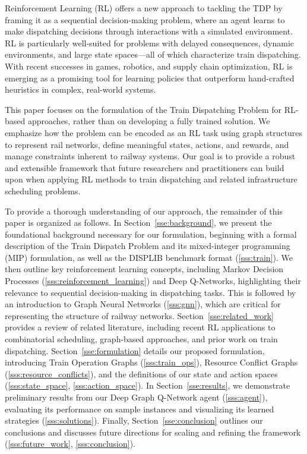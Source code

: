 \documentclass[runningheads]{llncs}
\begin{document}
Reinforcement Learning (RL) offers a new approach to tackling the TDP by framing it as a sequential decision-making problem, where an agent learns to make dispatching decisions through interactions with a simulated environment. 
RL is particularly well-suited for problems with delayed consequences, dynamic environments, and large state spaces—all of which characterize train dispatching. 
With recent successes in games, robotics, and supply chain optimization, RL is emerging as a promising tool for learning policies that outperform hand-crafted heuristics in complex, real-world systems.

This paper focuses on the formulation of the Train Dispatching Problem for RL-based approaches, rather than on developing a fully trained solution. 
We emphasize how the problem can be encoded as an RL task using graph structures to represent rail networks, define meaningful states, actions, and rewards, and manage constraints inherent to railway systems. 
Our goal is to provide a robust and extensible framework that future researchers and practitioners can build upon when applying RL methods to train dispatching and related infrastructure scheduling problems.

To provide a thorough understanding of our approach, the remainder of this paper is organized as follows. 
In Section~\ref{sse:background}, we present the foundational background necessary for our formulation, beginning with a formal description of the Train Dispatch Problem and its mixed-integer programming (MIP) formulation, as well as the DISPLIB benchmark format (\ref{sss:train}). 
We then outline key reinforcement learning concepts, including Markov Decision Processes (\ref{sss:reinforcement_learning}) and Deep Q-Networks, highlighting their relevance to sequential decision-making in dispatching tasks. This is followed by an introduction to Graph Neural Networks (\ref{sss:gnn}), which are critical for representing the structure of railway networks. 
Section~\ref{sse:related_work} provides a review of related literature, including recent RL applications to combinatorial scheduling, graph-based approaches, and prior work on train dispatching. 
Section~\ref{sse:formulation} details our proposed formulation, introducing Train Operation Graphs (\ref{sss:train_ops}), Resource Conflict Graphs (\ref{sss:resource_conflicts}), and the definitions of our state and action spaces (\ref{sss:state_space}, \ref{sss:action_space}). 
In Section~\ref{sse:results}, we demonstrate preliminary results from our Deep Graph Q-Network agent (\ref{sss:agent}), evaluating its performance on sample instances and visualizing its learned strategies (\ref{sss:solutions}). 
Finally, Section~\ref{sse:conclusion} outlines our conclusions and discusses future directions for scaling and refining the framework (\ref{sss:future_work}, \ref{sss:conclusion}).
\end{document}
